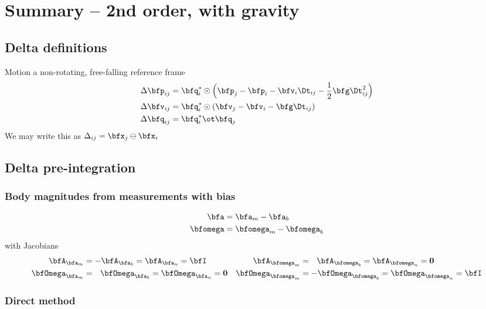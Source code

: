 \section{Summary -- 2nd order, with gravity}
\label{sec:summary-gravity-2nd}

\subsection{Delta definitions}

Motion \wrt a non-rotating, free-falling reference frame
%
\begin{align}
\begin{split}
\Dp_{ij} &= \bfq_i^*\od\Big(\bfp_j - \bfp_i - \bfv_i\Dt_{ij} - \frac12\bfg\Dt_{ij}^2\Big) \\
\Dv_{ij} &= \bfq_i^*\od(\bfv_j - \bfv_i - \bfg\Dt_{ij}) \\
\Dq_{ij} &= \bfq_i^*\ot\bfq_j 
\end{split}
\end{align}
%
We may write this as $\D_{ij}=\bfx_j\ominus\bfx_i$

\subsection{Delta pre-integration}

\subsubsection{Body magnitudes from measurements with bias}

\begin{align}
\begin{split}
\bfa &= \bfa_m - \ab \\
\bw &= \bw_m - \wb
\end{split}
\end{align}
%
with Jacobians
%
\begin{align*}
\bfA_{\bfa_m} 
  &= -\bfA_{\bfa_b} = \bfA_{\bfa_n} = \bfI 
& \bfA_{\bw_m} 
  &= ~~\bfA_{\bw_b} = \bfA_{\bw_n} = \bf0 \\
\bfOmega_{\bfa_m} 
  &= ~~\bfOmega_{\bfa_b} = \bfOmega_{\bfa_n} = \bf0 
& \bfOmega_{\bw_m} 
  &= -\bfOmega_{\bw_b} = \bfOmega_{\bw_n} = \bfI 
\end{align*}


\subsubsection{Direct method}

